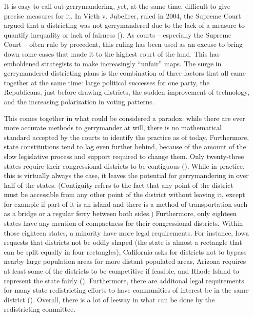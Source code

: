 \documentclass[letterpaper]{article}
\begin{document}
It is easy to call out gerrymandering, yet, at the same time, difficult to give precise measures for it. In Vieth v. Jubelirer, ruled in 2004, the Supreme Court argued that a districting was not gerrymandered due to the lack of a measure to quantify inequality or lack of fairness (\cite{vieth}). As courts – especially the Supreme Court – often rule by precedent, this ruling has been used as an excuse to bring down some cases that made it to the highest court of the land. This has emboldened strategists to make increasingly “unfair” maps. The surge in gerrymandered districting plans is the combination of three factors that all came together at the same time: large political successes for one party, the Republicans, just before drawing districts, the sudden improvement of technology, and the increasing polarization in voting patterns.

This comes together in what could be considered a paradox: while there are ever more accurate methods to gerrymander at will, there is no mathematical standard accepted by the courts to identify the practice as of today. Furthermore, state constitutions tend to lag even further behind, because of the amount of the slow legislative process and support required to change them. Only twenty-three states require their congressional districts to be contiguous (\cite{contiguity}). While in practice, this is virtually always the case, it leaves the potential for gerrymandering in over half of the states. (Contiguity refers to the fact that any point of the district must be accessible from any other point of the district without leaving it, except for example if part of it is an island and there is a method of transportation such as a bridge or a regular ferry between both sides.) Furthermore, only eighteen states have any mention of compactness for their congressional districts. Within those eighteen states, a minority have more legal requirements. For instance, Iowa requests that districts not be oddly shaped (the state is almost a rectangle that can be split equally in four rectangles), California asks for districts not to bypass nearby large population areas for more distant populated areas, Arizona requires at least some of the districts to be competitive if feasible, and Rhode Island to represent the state fairly (\cite{contiguity}). Furthermore, there are additonal legal requirements for many state redistricting efforts to have communities of interest be in the same district (\cite{brennan}). Overall, there is a lot of leeway in what can be done by the redistricting committee. 
\end{document}
